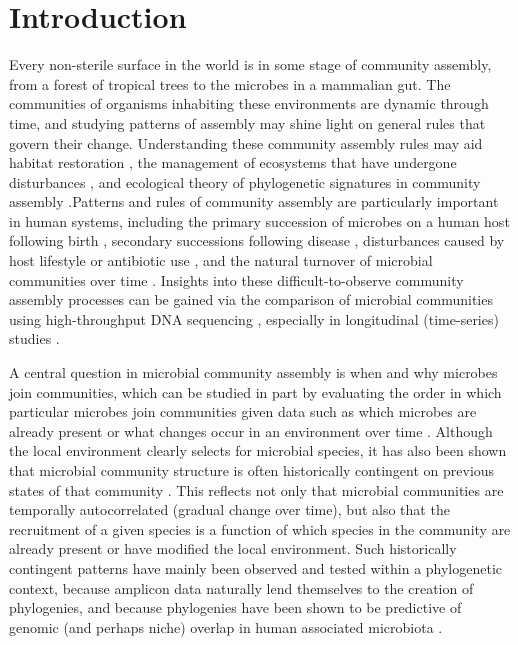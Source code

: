 \documentclass{article}
\begin{document}
{\parindent0pt \section{Introduction}} \label{sec:introduction}
Every non-sterile surface in the world is in some stage of community assembly, from a forest of tropical trees to the microbes in a mammalian gut. The communities of organisms inhabiting these environments are dynamic through time, and studying patterns of assembly may shine light on general rules that govern their change. Understanding these community assembly rules may aid habitat restoration \cite{Palmer1997,Temperton2004}, the management of ecosystems that have undergone disturbances \cite{Richards1999,Bengtsson2000}, and ecological theory of phylogenetic signatures in community assembly \cite{ODwyer2012,Goberna2014}.Patterns and rules of community assembly are particularly important in human systems, including the primary succession of microbes on a human host following birth \cite{Koenig2011}, secondary successions following disease \cite{Frank2007,David2014}, disturbances caused by host lifestyle or antibiotic use \cite{Peterfreund2012,Kennedy2016,Guittar2019}, and the natural turnover of microbial communities over time \cite{Caporaso2011}. Insights into these difficult-to-observe community assembly processes can be gained via the comparison of microbial communities using high-throughput DNA sequencing \cite{Caporaso2011,Nemergut2013,Nemergut2016}, especially in longitudinal (time-series) studies \cite{Caporaso2011,Koenig2011,Kennedy2016}.
\par
A central question in microbial community assembly is when and why microbes join communities, which can be studied in part by evaluating the order in which particular microbes join communities given data such as which microbes are already present or what changes occur in an environment over time \cite{Nemergut2013,Sprockett2018}. Although the local environment clearly selects for microbial species, it has also been shown that microbial community structure is often historically contingent on previous states of that community \cite{Nemergut2013,Fukami2015,Sprockett2018,Verster2018,Litvak2019}. This reflects not only that microbial communities are temporally autocorrelated (gradual change over time), but also that the recruitment of a given species is a function of which species in the community are already present or have modified the local environment. Such historically contingent patterns have mainly been observed and tested within a phylogenetic context, because amplicon data naturally lend themselves to the creation of phylogenies, and because phylogenies have been shown to be predictive of genomic (and perhaps niche) overlap in human associated microbiota \cite{Zaneveld2010,Langille2013}.
\end{document}
